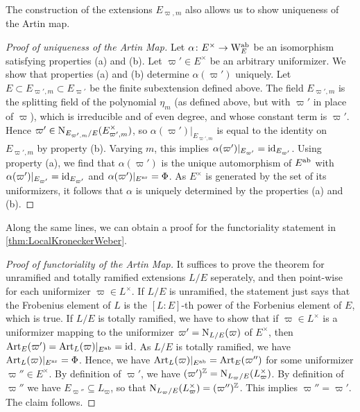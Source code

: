 \documentclass[../main.tex]{subfiles}
\begin{document}
The construction of the extensions $E_{\varpi, m}$ also allows us to show uniqueness 
of the Artin map.

\begin{proof}[Proof of uniqueness of the Artin Map]
  Let $\alpha\colon E^\times \to \mathrm W_E^{\mathrm{ab}}$ be
  an isomorphism satisfying properties (a) and (b). Let ${\varpi'} \in E^\times$
  be an arbitrary
  uniformizer. We show that properties (a) and (b) determine $\alpha({\varpi'})$ uniquely.
  Let $E \subset E_{{\varpi'}, m} \subset E_{\varpi'}$ be the finite subextension 
  defined above. The field $E_{{\varpi'}, m}$ is the splitting field of the polynomial
  $\eta_m$ (as defined above, but with $\varpi'$ in place of $\varpi$), which
  is irreducible and of even degree, and whose
  constant term is ${\varpi'}$. Hence ${\varpi'} \in
  \operatorname{N}_{E_{{\varpi'}, m}/E}(E_{{\varpi'}, m}^\times)$, so $\alpha({\varpi'})|_{E_{{\varpi'}, m}}$ is
  equal to the identity on $E_{{\varpi'}, m}$
  by property (b). Varying $m$, this implies $\alpha({\varpi'})|_{E_{\varpi'}} =
  \operatorname{id}_{E_{\varpi'}}$. Using property (a), we find that $\alpha({\varpi'})$ is the unique
  automorphism of $E^{\mathrm{ab}}$ with $\alpha({\varpi'})|_{E_{\varpi'}} = \operatorname{id}_{E_{\varpi'}}$ and
  $\alpha({\varpi'})|_{E^{\mathrm{nr}}} = \Phi$. As $E^\times$ is generated by the set of its
  uniformizers, it follows that $\alpha$ is uniquely determined by the
  properties (a) and (b).
\end{proof}

Along the same lines, we can obtain a proof for the functoriality statement 
in \cref{thm:LocalKroneckerWeber}. 

\begin{proof}[Proof of functoriality of the Artin Map]
It suffices to prove the theorem for unramified and totally ramified extensions
$L/E$ seperately, and then point-wise for each uniformizer $\varpi \in
L^\times$. If $L/E$ is unramified, the statement just says that the Frobenius
element of $L$ is the $[L:E]$-th power of the Forbenius element of $E$, which
is true. If $L/E$ is totally ramified, we have to show that 
if $\varpi \in L^\times$ is a uniformizer mapping
to the uniformizer $\varpi' = \operatorname{N}_{L/E}(\varpi)$ of $E^\times$, then 
$\operatorname{Art}_E(\varpi') = \operatorname{Art}_L(\varpi)|_{E^{\mathrm{ab}}} = \operatorname{id}$. As $L/E$ is totally ramified, we
have $\operatorname{Art}_L(\varpi)|_{E^{\mathrm{nr}}} = \Phi$. Hence, we have 
$\operatorname{Art}_L(\varpi)|_{E^{\mathrm{ab}}} = \operatorname{Art}_E(\varpi'')$ for some uniformizer $\varpi'' \in
E^\times$. By definition of $\varpi'$, we have $(\varpi')^{\mathbb{Z}} =
\operatorname{N}_{L_{\varpi}/E}(L_\varpi^\times)$. By definition of $\varpi''$ we have
$E_{\varpi''} \subseteq L_{\varpi}$, so that $\operatorname{N}_{L_{\varpi}/E}(L_\varpi^\times) 
= (\varpi'')^{\mathbb{Z}}$. This implies $\varpi'' = \varpi'$. The claim follows.
\end{proof}
\end{document}
